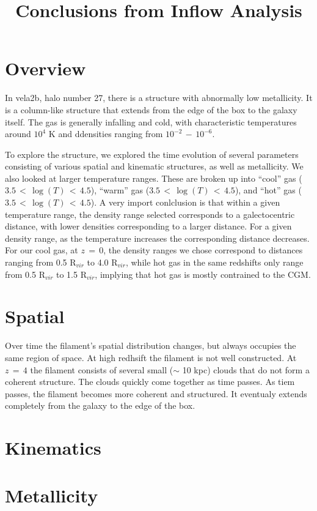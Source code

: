 \documentclass{article}
\title{Conclusions from Inflow Analysis}
\begin{document}
\maketitle



\section{Overview}

In vela2b, halo number 27, there is a structure with abnormally low
metallicity.  It is a column-like structure that extends from the edge of the 
box to the galaxy itself. The gas is generally infalling and cold, with  
characteristic temperatures around $10^4$ K and ddensities ranging from 
$10^{-2}\,-\,10^{-6}$.


To explore the structure, we explored the time evolution of several parameters
consisting of various spatial and kinematic structures, as well as metallicity.
We also looked at larger temperature ranges. These are broken up into ``cool''
gas ($3.5\,<\,\log(T)\,<\,4.5$), ``warm'' gas ($3.5\,<\,\log(T)\,<\,4.5$), and
``hot'' gas ($3.5\,<\,\log(T)\,<\,4.5$). A very import conlclusion is that
within a given temperature range, the density range selected corresponds to a
galectocentric distance, with lower densities corresponding to a larger
distance. For a given density range, as the temperature increases the
corresponding distance decreases. For our cool gas, at $z\,=\,0$, the density
ranges we chose correspond to distances ranging from 0.5 R$_{vir}$ to 4.0
R$_{vir}$, while hot gas in the same redshifts only range from 0.5 R$_{vir}$
to 1.5 R$_{vir}$, implying that hot gas is mostly contrained to the CGM. 



\section{Spatial}
Over time the filament's spatial distribution changes, but always occupies the same 
region of space. At high redhsift the filament is not well constructed. At $z\,=\,4$
the filament consists of several small ($\sim$ 10 kpc) clouds that do not form a
coherent structure. The clouds quickly come together as time passes. As tiem
passes, the filament becomes more coherent and structured. It eventualy extends
completely from the galaxy to the edge of the box. 


\section{Kinematics}



\section{Metallicity}
\end{document}

